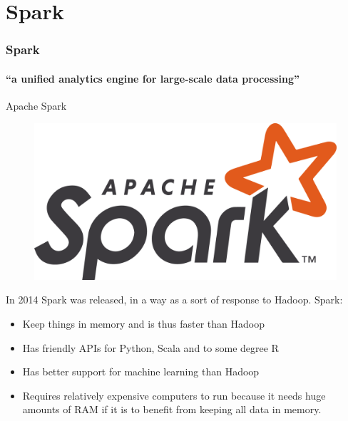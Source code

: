\documentclass[aspectratio=169,usenames,dvipsnames]{beamer}
\begin{document}
\section{Spark}
    \begin{frame}
        \frametitle{Spark}
        \framesubtitle{``a unified analytics engine for large-scale data processing''}
        \begin{block}{Apache Spark}
        \begin{figure}
        \vspace{-1\baselineskip}
        \includegraphics[width=0.9\linewidth]{figures/Spark.png}\hfill
        \end{figure}
        In 2014 Spark was released, in a way as a sort of response to Hadoop. Spark:
        \begin{itemize}
            \item Keep things in memory and is thus faster than Hadoop
        \end{itemize}\vspace{-4pt}

        \begin{itemize}
            \item Has friendly APIs for Python, Scala and to some degree R
            \item Has better support for machine learning than Hadoop
            \item Requires relatively expensive computers to run because it
            needs huge amounts of RAM if it is to benefit from keeping all data
            in memory.
        \end{itemize}
        \end{block}
    \end{frame}
\end{document}
